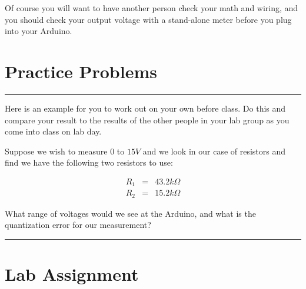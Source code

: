 \bigskip Of course you will want to have another person check your math and
wiring, and you should check your output voltage with a stand-alone meter
before you plug into your Arduino.

\section{Practice Problems}

\rule{11cm}{0.03cm}

Here is an example for you to work out on your own before class. Do this and compare your result to the results of the other people in your lab group as you come into class on lab day.

Suppose we wish to measure $0$ to $15\unit{V}$ and we look in our case of resistors and find we have the following two resistors to use:

\begin{eqnarray*}
	R_{1} &=&43.2\unit{k\Omega} \\
	R_{2} &=&15.2\unit{k\Omega}
\end{eqnarray*}

What range of voltages would we see at the Arduino, and what is the quantization error for our measurement?

\rule{11cm}{0.03cm}


%


\vspace*{\fill}

\pagebreak

\section{Lab Assignment}

